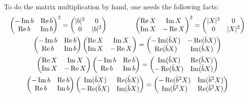 To do the matrix multiplication by hand, one needs the following facts:
\begin{gather*}
	\begin{pmatrix}
		-\Im b & \Re b \\ \Re b & \Im b
	\end{pmatrix}^2
	=
	\begin{pmatrix}
		\abs{b}^2 & 0 \\ 0 & \abs{b}^2
	\end{pmatrix} \qquad \qquad 
	\begin{pmatrix}
		\Re X & \Im X \\ \Im X & -\Re X
	\end{pmatrix}^2
	=
	\begin{pmatrix}
		\abs{X}^2 & 0 \\ 0 & \abs{X}^2
	\end{pmatrix}\\
	\begin{pmatrix}
	-\Im b & \Re b \\ \Re b & \Im b
	\end{pmatrix}
	\begin{pmatrix}
		\Re X & \Im X \\ \Im X & -\Re X
	\end{pmatrix}
	=
	\begin{pmatrix}
		-\Im(\bar bX) & -\Re(\bar bX) \\ \Re(\bar bX) & \Im(\bar bX)
	\end{pmatrix}\\
	\begin{pmatrix}
	\Re X & \Im X \\ \Im X & -\Re X
	\end{pmatrix}
	\begin{pmatrix}
	-\Im b & \Re b \\ \Re b & \Im b
	\end{pmatrix}
	=
	\begin{pmatrix}
	\Im(\bar bX) & \Re(\bar bX) \\ -\Re(\bar bX) & \Im(\bar bX)
	\end{pmatrix}\\
	\begin{pmatrix}
	-\Im b & \Re b \\ \Re b & \Im b
	\end{pmatrix}
	\begin{pmatrix}
		\Im(\bar bX) & \Re(\bar bX) \\ -\Re(\bar bX) & \Im(\bar bX)
	\end{pmatrix}
	=
	\begin{pmatrix}
		-\Re(\bar b^2X) & \Im(\bar b^2X) \\ \Im(\bar b^2X) & \Re(\bar b^2X)
	\end{pmatrix}
\end{gather*}
